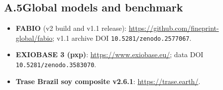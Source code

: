 \subsection*{A.5\quad Global models and benchmark}
\begin{itemize}
  \item \textbf{FABIO} (v2 build and v1.1 release):
    \url{https://github.com/fineprint-global/fabio}; v1.1 archive DOI
    \texttt{10.5281/zenodo.2577067}.
  \item \textbf{EXIOBASE 3 (pxp)}: \url{https://www.exiobase.eu/};
    data DOI \texttt{10.5281/zenodo.3583070}.
  \item \textbf{Trase Brazil soy composite v2.6.1}:
    \url{https://trase.earth/}.
\end{itemize}
